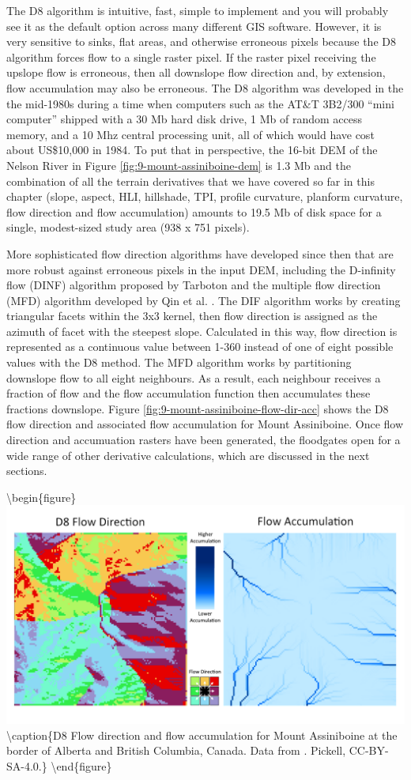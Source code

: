 \documentclass[
]{book}
\begin{document}
The D8 algorithm is intuitive, fast, simple to implement and you will probably see it as the default option across many different GIS software. However, it is very sensitive to sinks, flat areas, and otherwise erroneous pixels because the D8 algorithm forces flow to a single raster pixel. If the raster pixel receiving the upslope flow is erroneous, then all downslope flow direction and, by extension, flow accumulation may also be erroneous. The D8 algorithm was developed in the the mid-1980s during a time when computers such as the AT\&T 3B2/300 ``mini computer'' shipped with a 30 Mb hard disk drive, 1 Mb of random access memory, and a 10 Mhz central processing unit, all of which would have cost about US\$10,000 in 1984. To put that in perspective, the 16-bit DEM of the Nelson River in Figure \ref{fig:9-mount-assiniboine-dem} is 1.3 Mb and the combination of all the terrain derivatives that we have covered so far in this chapter (slope, aspect, HLI, hillshade, TPI, profile curvature, planform curvature, flow direction and flow accumulation) amounts to 19.5 Mb of disk space for a single, modest-sized study area (938 x 751 pixels).

More sophisticated flow direction algorithms have developed since then that are more robust against erroneous pixels in the input DEM, including the D-infinity flow (DINF) algorithm proposed by Tarboton \citep{tarboton_new_1997} and the multiple flow direction (MFD) algorithm developed by Qin et al. \citep{qin_adaptive_2007}. The DIF algorithm works by creating triangular facets within the 3x3 kernel, then flow direction is assigned as the azimuth of facet with the steepest slope. Calculated in this way, flow direction is represented as a continuous value between 1-360 instead of one of eight possible values with the D8 method. The MFD algorithm works by partitioning downslope flow to all eight neighbours. As a result, each neighbour receives a fraction of flow and the flow accumulation function then accumulates these fractions downslope. Figure \ref{fig:9-mount-assiniboine-flow-dir-acc} shows the D8 flow direction and associated flow accumulation for Mount Assiniboine. Once flow direction and accumuation rasters have been generated, the floodgates open for a wide range of other derivative calculations, which are discussed in the next sections.

\textbackslash begin\{figure\}
\includegraphics[width=0.75\linewidth]{images/09-mount-assiniboine-flow-dir-acc} \textbackslash caption\{D8 Flow direction and flow accumulation for Mount Assiniboine at the border of Alberta and British Columbia, Canada. Data from \citet{natural_resources_canada_canadian_2015}. Pickell, CC-BY-SA-4.0.\}\label{fig:9-mount-assiniboine-flow-dir-acc}
\textbackslash end\{figure\}
\end{document}
